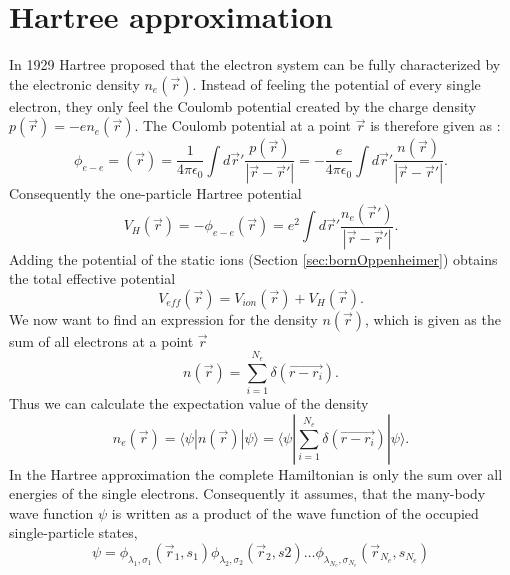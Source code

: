 	\section{Hartree approximation}
		In 1929 Hartree proposed that the electron system can be fully characterized by the electronic density $n_e(\vec r)$. Instead of feeling the potential of every single electron, they only feel the Coulomb potential created by the charge density $p(\vec r) = -e n_e(\vec r)$. The Coulomb potential at a point $\vec r$ is therefore given as :
		\begin{equation}
			\phi_{e-e}=(\vec r) = \frac{1}{4 \pi \epsilon_0}\int d \vec r'\frac{p(\vec r)}{|\vec r - \vec r'|} =  -\frac{e}{4 \pi \epsilon_0}\int d \vec r'\frac{n(\vec r)}{|\vec r - \vec r'|}.
		\end{equation}
		Consequently the one-particle Hartree potential
		\begin{equation}
			V_H (\vec r) = - \phi_{e-e}(\vec r) = e^2 \int d \vec r' \frac{n_e(\vec r')}{|\vec r - \vec r'|}.
		\end{equation}
		Adding the potential of the static ions (Section \ref{sec:bornOppenheimer}) obtains the total effective potential
		\begin{equation}
			\label{eq:HatreeEffectivePotential}
			V_{eff}(\vec r) = V_{ion} (\vec r) + V_H(\vec r).
		\end{equation}
		We now want to find an expression for the density $n(\vec r)$, which is given as the sum of all electrons at a point $\vec r$
		\begin{equation}
			n(\vec r) = \sum_{i=1}^{N_e} \delta(\vec{r - r_i}).
		\end{equation}
		Thus we can calculate the expectation value of the density
		\begin{equation}
			\label{eq:densityExpectation}
			n_e(\vec r) = \langle \psi | n(\vec r) | \psi \rangle = \langle \psi | \sum_{i=1}^{N_e} \delta(\vec{r - r_i}) | \psi \rangle.
		\end{equation}
		In the Hartree approximation the complete Hamiltonian is only the sum over all energies of the single electrons. Consequently it assumes, that the many-body wave function $\psi$ is written as a product of the wave function of the occupied single-particle states,
		\begin{equation}
			\psi = \phi_{\lambda_1, \sigma_1}(\vec r_1, s_1)\phi_{\lambda_2, \sigma_2}(\vec r_2, s2) \dots \phi_{\lambda_{N_e}, \sigma_{N_e}}(\vec r_{N_e}, s_{N_e}) 
		\end{equation}
